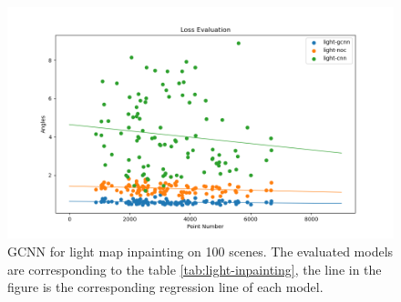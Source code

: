\documentclass[border=15pt, multi, tikz]{article}
\begin{document}
\begin{figure}[H]
	\centering
	\includegraphics[width=0.9\linewidth]{./Figures/gcnn-light/scatter-light.png}
	\caption{GCNN for light map inpainting on 100 scenes. The evaluated models are corresponding to the table \ref{tab:light-inpainting}, the line in the figure is the corresponding regression line of each model.}
	\label{fig:light-scatter}
\end{figure}
\end{document}

